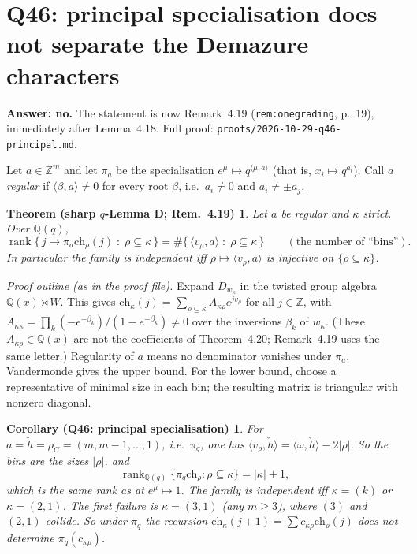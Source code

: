 \documentclass[11pt]{article}
\theoremstyle{plain}
\newtheorem*{thmQ46}{Theorem (sharp $q$-Lemma D; Rem.~4.19)}
\newtheorem*{corQ46}{Corollary (Q46: principal specialisation)}
\theoremstyle{remark}
\newcommand{\ch}{\mathrm{ch}}
\begin{document}
\section{Q46: principal specialisation does not separate the Demazure characters}

\textbf{Answer: no.} The statement is now Remark~4.19 (\texttt{rem:onegrading}, p.~19), immediately
after Lemma~4.18. Full proof: \texttt{proofs/2026-10-29-q46-principal.md}.

Let $a\in\mathbb{Z}^m$ and let $\pi_a$ be the specialisation $e^\mu\mapsto q^{\langle\mu,a\rangle}$
(that is, $x_i\mapsto q^{a_i}$). Call $a$ \emph{regular} if $\langle\beta,a\rangle\neq0$ for every
root $\beta$, i.e.\ $a_i\neq0$ and $a_i\neq\pm a_j$.

\begin{thmQ46}
Let $a$ be regular and $\kappa$ strict. Over $\mathbb{Q}(q)$,
\[
\operatorname{rank}\{\,j\mapsto\pi_a\ch_\rho(j)\;:\;\rho\subseteq\kappa\,\}
=\#\{\,\langle v_\rho,a\rangle\;:\;\rho\subseteq\kappa\,\}\qquad(\text{the number of ``bins''}).
\]
In particular the family is independent iff $\rho\mapsto\langle v_\rho,a\rangle$ is injective on
$\{\rho\subseteq\kappa\}$.
\end{thmQ46}

\emph{Proof outline (as in the proof file).} Expand $D_{w_\kappa}$ in the twisted group algebra
$\mathbb{Q}(x)\rtimes W$. This gives $\ch_\kappa(j)=\sum_{\rho\subseteq\kappa}A_{\kappa\rho}e^{jv_\rho}$ for all
$j\in\mathbb{Z}$, with $A_{\kappa\kappa}=\prod_k(-e^{-\beta_k})/(1-e^{-\beta_k})\neq0$ over the inversions
$\beta_k$ of $w_\kappa$. (These $A_{\kappa\rho}\in\mathbb{Q}(x)$ are not the coefficients of
Theorem~4.20; Remark~4.19 uses the same letter.) Regularity of $a$ means no denominator vanishes under
$\pi_a$. Vandermonde gives the upper bound. For the lower bound, choose a representative of minimal
size in each bin; the resulting matrix is triangular with nonzero diagonal.

\begin{corQ46}
For $a=\check h=\rho_C=(m,m-1,\dots,1)$, i.e.\ $\pi_q$, one has
$\langle v_\rho,\check h\rangle=\langle\omega,\check h\rangle-2|\rho|$. So the bins are the sizes
$|\rho|$, and
\[
\operatorname{rank}_{\mathbb{Q}(q)}\{\pi_q\ch_\rho:\rho\subseteq\kappa\}=|\kappa|+1,
\]
which is the same rank as at $e^\mu\mapsto1$. The family is independent iff $\kappa=(k)$ or
$\kappa=(2,1)$. The first failure is $\kappa=(3,1)$ (any $m\ge3$), where $(3)$ and $(2,1)$ collide. So
under $\pi_q$ the recursion $\ch_\kappa(j+1)=\sum c_{\kappa\rho}\ch_\rho(j)$ does not determine
$\pi_q(c_{\kappa\rho})$.
\end{corQ46}
\end{document}
